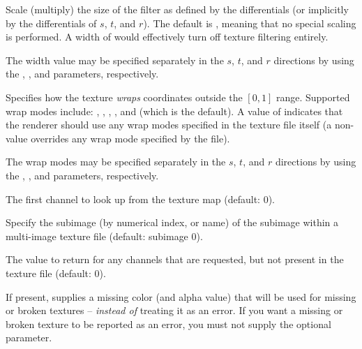 \documentclass[11pt,letterpaper]{book}
\begin{document}
\vspace{12pt}
Scale (multiply) the size of the filter as defined by the differentials
(or implicitly by the differentials of $s$, $t$, and $r$).  The default is
{}, meaning that no special scaling is performed.  A width of
{} would effectively turn off texture filtering entirely.

The width value may be specified separately in the $s$, $t$, and $r$
directions by using the , , and  parameters,
respectively.
\apiend
\vspace{-16pt}

\vspace{12pt}

Specifies how the texture \emph{wraps} coordinates outside the $[0,1]$
range.  Supported wrap modes include: , ,
, , and  (which is the default).  A
value of  indicates that the renderer should use any wrap
modes specified in the texture file itself (a non- value
overrides any wrap mode specified by the file).

The wrap modes may be specified separately in the $s$, $t$, and $r$
directions by using the , , and 
parameters, respectively.
\apiend
\vspace{-16pt}

\vspace{12pt}
The first channel to look up from the texture map (default: 0).
\apiend
\vspace{-16pt}

\vspace{12pt}
Specify the subimage (by numerical index, or name) of the subimage
within a multi-image texture file (default: subimage 0).
\apiend
\vspace{-16pt}

\vspace{12pt}
The value to return for any channels that are requested,
but not present in the texture file (default: 0).
\apiend
\vspace{-16pt}

\vspace{12pt}
If present, supplies a missing color (and alpha value) that will
be used for missing or broken textures -- \emph{instead of} treating
it as an error.  If you want a missing or broken texture to be reported
as an error, you must not supply the optional 
parameter.
\apiend
\vspace{-16pt}
\end{document}
